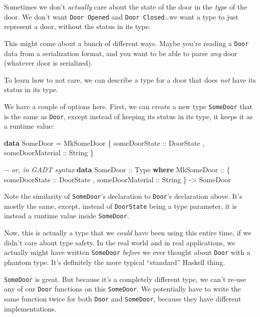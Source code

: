 \documentclass[]{article}
\newenvironment{Shaded}{}{}
\newcommand{\CommentTok}[1]{\textcolor[rgb]{0.38,0.63,0.69}{\textit{#1}}}
\newcommand{\DataTypeTok}[1]{\textcolor[rgb]{0.56,0.13,0.00}{#1}}
\newcommand{\KeywordTok}[1]{\textcolor[rgb]{0.00,0.44,0.13}{\textbf{#1}}}
\newcommand{\NormalTok}[1]{#1}
\newcommand{\OtherTok}[1]{\textcolor[rgb]{0.00,0.44,0.13}{#1}}
\begin{document}
Sometimes we don't \emph{actually} care about the state of the door in the
\emph{type} of the door. We don't want \texttt{Door\ \textquotesingle{}Opened}
and \texttt{Door\ \textquotesingle{}Closed}\ldots we want a type to just
represent a door, without the status in its type.

This might come about a bunch of different ways. Maybe you're reading a
\texttt{Door} data from a serialization format, and you want to be able to parse
\emph{any} door (whatever door is serialized).

To learn how to not care, we can describe a type for a door that does \emph{not}
have its status in its type.

We have a couple of options here. First, we can create a new type
\texttt{SomeDoor} that is the same as \texttt{Door}, except instead of keeping
its status in its type, it keeps it as a runtime value:

\begin{Shaded}
\begin{Highlighting}[]
\KeywordTok{data} \DataTypeTok{SomeDoor} \OtherTok{=} \DataTypeTok{MkSomeDoor}
\NormalTok{    \{}\OtherTok{ someDoorState    ::} \DataTypeTok{DoorState}
\NormalTok{    ,}\OtherTok{ someDoorMaterial ::} \DataTypeTok{String}
\NormalTok{    \}}

\CommentTok{{-}{-} or, in GADT syntax}
\KeywordTok{data} \DataTypeTok{SomeDoor}\OtherTok{ ::} \DataTypeTok{Type} \KeywordTok{where}
    \DataTypeTok{MkSomeDoor} \OtherTok{::}
\NormalTok{      \{}\OtherTok{ someDoorState    ::} \DataTypeTok{DoorState}
\NormalTok{      ,}\OtherTok{ someDoorMaterial ::} \DataTypeTok{String}
\NormalTok{      \} }\OtherTok{{-}>} \DataTypeTok{SomeDoor}
\end{Highlighting}
\end{Shaded}

Note the similarity of \texttt{SomeDoor}'s declaration to \texttt{Door}'s
declaration above. It's mostly the same, except, instead of \texttt{DoorState}
being a type parameter, it is instead a runtime value inside \texttt{SomeDoor}.

Now, this is actually a type that we \emph{could} have been using this entire
time, if we didn't care about type safety. In the real world and in real
applications, we actually might have written \texttt{SomeDoor} \emph{before} we
ever thought about \texttt{Door} with a phantom type. It's definitely the more
typical ``standard'' Haskell thing.

\texttt{SomeDoor} is great. But because it's a completely different type, we
can't re-use any of our \texttt{Door} functions on this \texttt{SomeDoor}. We
potentially have to write the same function twice for both \texttt{Door} and
\texttt{SomeDoor}, because they have different implementations.
\end{document}
